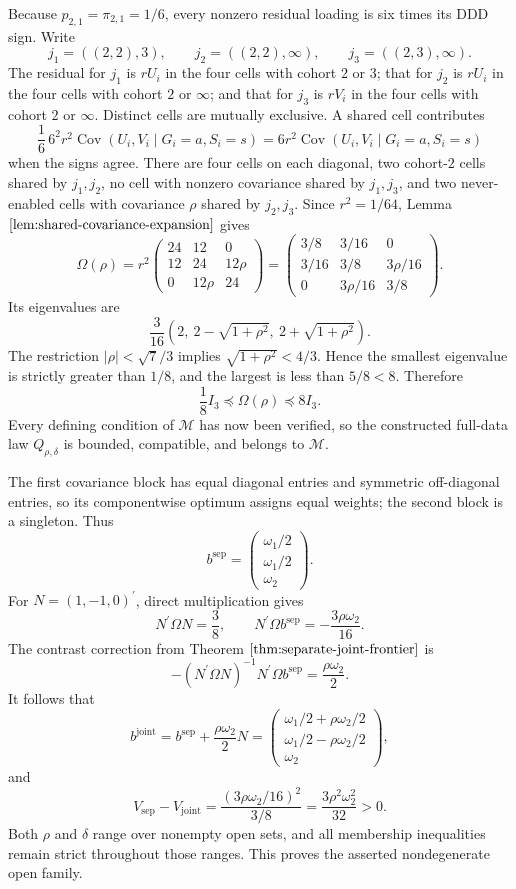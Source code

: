 Because \(p_{2,1}=\pi_{2,1}=1/6\), every nonzero residual loading is six times its DDD sign. Write
\[
 j_1=((2,2),3),\qquad
 j_2=((2,2),\infty),\qquad
 j_3=((2,3),\infty).
\]
The residual for \(j_1\) is \(rU_i\) in the four cells with cohort \(2\) or \(3\); that for \(j_2\) is \(rU_i\) in the four cells with cohort \(2\) or \(\infty\); and that for \(j_3\) is \(rV_i\) in the four cells with cohort \(2\) or \(\infty\). Distinct cells are mutually exclusive. A shared cell contributes
\[
 \frac16\,6^2r^2\operatorname{Cov}(U_i,V_i\mid G_i=a,S_i=s)
 =6r^2\operatorname{Cov}(U_i,V_i\mid G_i=a,S_i=s)
\]
when the signs agree. There are four cells on each diagonal, two cohort-\(2\) cells shared by \(j_1,j_2\), no cell with nonzero covariance shared by \(j_1,j_3\), and two never-enabled cells with covariance \(\rho\) shared by \(j_2,j_3\). Since \(r^2=1/64\), Lemma \(\ref{lem:shared-covariance-expansion}\) gives
\[
 \Omega(\rho)=r^2
 \begin{pmatrix}
 24&12&0\\
 12&24&12\rho\\
 0&12\rho&24
 \end{pmatrix}
 =
 \begin{pmatrix}
 3/8&3/16&0\\
 3/16&3/8&3\rho/16\\
 0&3\rho/16&3/8
 \end{pmatrix}.
\]
Its eigenvalues are
\[
 \frac3{16}\left(2,\ 2-\sqrt{1+\rho^2},\ 2+\sqrt{1+\rho^2}\right).
\]
The restriction \(|\rho|<\sqrt7/3\) implies \(\sqrt{1+\rho^2}<4/3\). Hence the smallest eigenvalue is strictly greater than \(1/8\), and the largest is less than \(5/8<8\). Therefore
\[
 \frac18I_3\preceq\Omega(\rho)\preceq8I_3.
\]
Every defining condition of \(\mathcal M\) has now been verified, so the constructed full-data law \(Q_{\rho,\delta}\) is bounded, compatible, and belongs to \(\mathcal M\).

The first covariance block has equal diagonal entries and symmetric off-diagonal entries, so its componentwise optimum assigns equal weights; the second block is a singleton. Thus
\[
 b^{\mathrm{sep}}=
 \begin{pmatrix}\omega_1/2\\ \omega_1/2\\ \omega_2\end{pmatrix}.
\]
For \(N=(1,-1,0)^{\prime}\), direct multiplication gives
\[
 N^{\prime}\Omega N=\frac38,
 \qquad
 N^{\prime}\Omega b^{\mathrm{sep}}=-\frac{3\rho\omega_2}{16}.
\]
The contrast correction from Theorem \(\ref{thm:separate-joint-frontier}\) is
\[
 -(N^{\prime}\Omega N)^{-1}N^{\prime}\Omega b^{\mathrm{sep}}
 =\frac{\rho\omega_2}{2}.
\]
It follows that
\[
 b^{\mathrm{joint}}
 =b^{\mathrm{sep}}+\frac{\rho\omega_2}{2}N
 =\begin{pmatrix}
 \omega_1/2+\rho\omega_2/2\\
 \omega_1/2-\rho\omega_2/2\\
 \omega_2
 \end{pmatrix},
\]
and
\[
 V_{\mathrm{sep}}-V_{\mathrm{joint}}
 =\frac{(3\rho\omega_2/16)^2}{3/8}
 =\frac{3\rho^2\omega_2^2}{32}>0.
\]
Both \(\rho\) and \(\delta\) range over nonempty open sets, and all membership inequalities remain strict throughout those ranges. This proves the asserted nondegenerate open family.